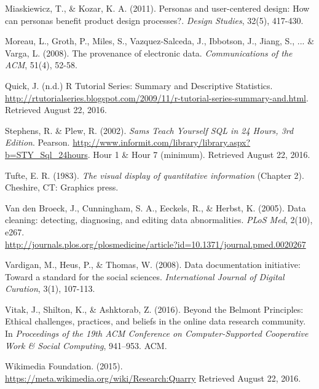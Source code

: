 \documentclass[11pt]{article}
\begin{document}
\begin{description}
\item Miaskiewicz, T., \& Kozar, K. A. (2011). Personas and user-centered design: How can personas benefit product design processes?. \textit{Design Studies}, 32(5), 417-430.
\item Moreau, L., Groth, P., Miles, S., Vazquez-Salceda, J., Ibbotson, J., Jiang, S., ... \& Varga, L. (2008). The provenance of electronic data. \textit{Communications of the ACM}, 51(4), 52-58.
\item Quick, J. (n.d.) R Tutorial Series: Summary and Descriptive Statistics. \url{http://rtutorialseries.blogspot.com/2009/11/r-tutorial-series-summary-and.html}. Retrieved August 22, 2016.
\item Stephens, R. \& Plew, R. (2002). \textit{Sams Teach Yourself SQL in 24 Hours, 3rd Edition}. Pearson. \url{http://www.informit.com/library/library.aspx?b=STY_Sql_24hours}. Hour 1 \& Hour 7 (minimum). Retrieved August 22, 2016.
\item Tufte, E. R. (1983). \textit{The visual display of quantitative information} (Chapter 2). Cheshire, CT: Graphics press.
\item Van den Broeck, J., Cunningham, S. A., Eeckels, R., \& Herbst, K. (2005). Data cleaning: detecting, diagnosing, and editing data abnormalities. \textit{PLoS Med}, 2(10), e267. \\ \url{http://journals.plos.org/plosmedicine/article?id=10.1371/journal.pmed.0020267}
\item Vardigan, M., Heus, P., \& Thomas, W. (2008). Data documentation initiative: Toward a standard for the social sciences. \textit{International Journal of Digital Curation}, 3(1), 107-113.
\item Vitak, J., Shilton, K., \& Ashktorab, Z. (2016). Beyond the Belmont Principles: Ethical challenges, practices, and beliefs in the online data research community. In \textit{Proceedings of the 19th ACM Conference on Computer-Supported Cooperative Work \& Social Computing}, 941--953. ACM.
\item Wikimedia Foundation. (2015). \url{https://meta.wikimedia.org/wiki/Research:Quarry} Retrieved August 22, 2016.
\end{description}

\end{document}

